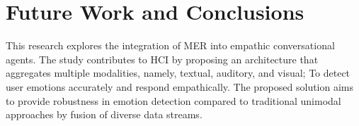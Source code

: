 \documentclass[runningheads]{llncs}
\begin{document}





\section{Future Work and Conclusions}
\label{sec:conclusions}
This research explores the integration of MER into empathic conversational agents. The study contributes to HCI by proposing an architecture that aggregates multiple modalities, namely, textual, auditory, and visual; To detect user emotions accurately and respond empathically. The proposed solution aims to provide robustness in emotion detection compared to traditional unimodal approaches by fusion of diverse data streams.
\end{document}
